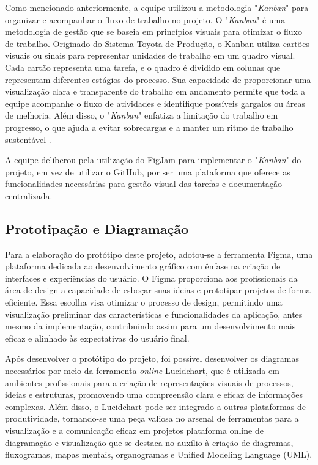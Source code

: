 Como mencionado anteriormente, a equipe utilizou a metodologia "\textit{Kanban}" para organizar e acompanhar o fluxo de trabalho no projeto. O "\textit{Kanban}" é uma metodologia de gestão que se baseia em princípios visuais para otimizar o fluxo de trabalho. Originado do Sistema Toyota de Produção, o Kanban utiliza cartões visuais ou sinais para representar unidades de trabalho em um quadro visual. Cada cartão representa uma tarefa, e o quadro é dividido em colunas que representam diferentes estágios do processo. Sua capacidade de proporcionar uma visualização clara e transparente do trabalho em andamento permite que toda a equipe acompanhe o fluxo de atividades e identifique possíveis gargalos ou áreas de melhoria. Além disso, o "\textit{Kanban}" enfatiza a limitação do trabalho em progresso, o que ajuda a evitar sobrecargas e a manter um ritmo de trabalho sustentável \cite{Boeg.J}.

A equipe deliberou pela utilização do FigJam para implementar o "\textit{Kanban}" do projeto, em vez de utilizar o GitHub, por ser uma plataforma que oferece as funcionalidades necessárias para gestão visual das tarefas e documentação centralizada.

\subsection*{Prototipação e Diagramação}
Para a elaboração do protótipo deste projeto, adotou-se a ferramenta Figma, uma plataforma dedicada ao desenvolvimento gráfico com ênfase na criação de interfaces e experiências do usuário. O Figma proporciona aos profissionais da área de design a capacidade de esboçar suas ideias e prototipar projetos de forma eficiente. Essa escolha visa otimizar o processo de design, permitindo uma visualização preliminar das características e funcionalidades da aplicação, antes mesmo da implementação, contribuindo assim para um desenvolvimento mais eficaz e alinhado às expectativas do usuário final.
 
Após desenvolver o protótipo do projeto, foi possível desenvolver os diagramas necessários por meio da ferramenta \textit{online} \href{http://www.lucidchart.com/}{Lucidchart}, que é utilizada em ambientes profissionais para a criação de representações visuais de processos, ideias e estruturas, promovendo uma compreensão clara e eficaz de informações complexas. Além disso, o Lucidchart pode ser integrado a outras plataformas de produtividade, tornando-se uma peça valiosa no arsenal de ferramentas para a visualização e a comunicação eficaz em projetos plataforma online de diagramação e visualização que se destaca no auxílio à criação de diagramas, fluxogramas, mapas mentais, organogramas e Unified Modeling Language (UML).

